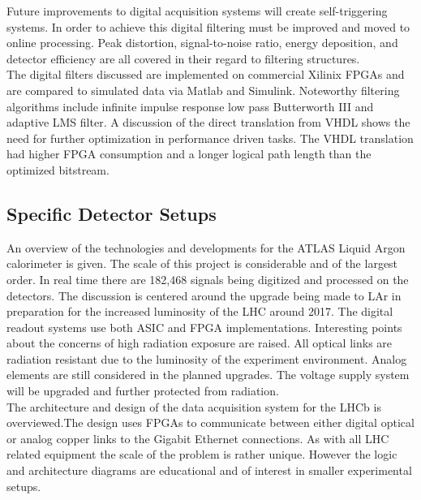 \documentclass[12pt]{article}
\begin{document}
\begin{doublespacing}
{\large\textbf{\cite{Alberto200999}}}
Future improvements to digital acquisition systems will create self-triggering systems. In order to achieve this digital filtering must be improved and moved to online processing. Peak distortion, signal-to-noise ratio, energy deposition, and detector efficiency are all covered in their regard to filtering structures.
\\
The digital filters discussed are implemented on commercial Xilinix FPGAs and are compared to simulated data via Matlab and Simulink. Noteworthy filtering algorithms include infinite impulse response low pass Butterworth III and adaptive LMS filter. A discussion of the direct translation from VHDL shows the need for further optimization in performance driven tasks. The VHDL translation had higher FPGA consumption and a longer logical path length than the optimized bitstream.
\\[20pt]


\subsection{Specific Detector Setups}

{\large\textbf{\cite{Chen2010261}}}
An overview of the technologies and developments for the ATLAS Liquid Argon calorimeter is given. The scale of this project is considerable and of the largest order. In real time there are 182,468 signals being digitized and processed on the detectors. The discussion is centered around the upgrade being made to LAr in preparation for the increased luminosity of the LHC around 2017. The digital readout systems use both ASIC and FPGA implementations.
Interesting points about the concerns of high radiation exposure are raised. All optical links are radiation resistant due to the luminosity of the experiment environment. Analog elements are still considered in the planned upgrades. The voltage supply system will be upgraded and further protected from radiation.
 \\[20pt]


{\large\textbf{\cite{Haefeli2006119}}}
The architecture and design of the data acquisition system for the LHCb is overviewed.The design uses FPGAs to communicate between either digital optical or analog copper links to the Gigabit Ethernet connections. As with all LHC related equipment the scale of the problem is rather unique. However the logic and architecture diagrams are educational and of interest in smaller experimental setups.
\\[20pt]



\end{doublespacing}
\end{document}

